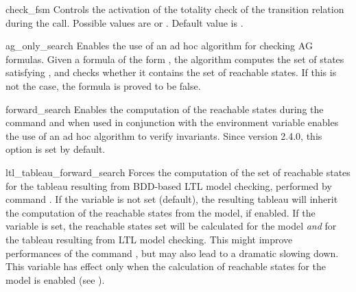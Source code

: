 \begin{nusmvVar} {check\_fsm}{}{}
Controls the activation of the totality check of the transition relation
during the \linebreak {} call. Possible values are  or
. Default value is .
\end{nusmvVar}








\begin{nusmvVar} {ag\_only\_search}{}{}
Enables the use of an ad hoc algorithm for checking AG formulas.
Given a formula of the form , the algorithm computes
the set of states satisfying , and checks whether it
contains the set of reachable states. If this is not the case, the
formula is proved to be false.
\end{nusmvVar}

\begin{nusmvVar} {forward\_search}{}{}
Enables the computation of the reachable states during the
 command and when used in conjunction with the
 environment variable enables the use of an ad hoc
algorithm to verify invariants. Since version 2.4.0, this option is
set by default.
\end{nusmvVar}


\begin{nusmvVar} {ltl\_tableau\_forward\_search}{}{}
Forces the computation of the set of reachable states for the tableau
resulting from BDD-based LTL model checking, performed by command
. If the variable
 is not set (default), the
resulting tableau will inherit the computation of the reachable states
from the model, if enabled. If the variable is set, the reachable
states set will be calculated for the model \emph{and} for the tableau
resulting from LTL model checking. This might improve performances of
the command , but may also lead to a dramatic
slowing down. This variable has effect only when the calculation of
reachable states for the model is enabled (see
).
\end{nusmvVar}

